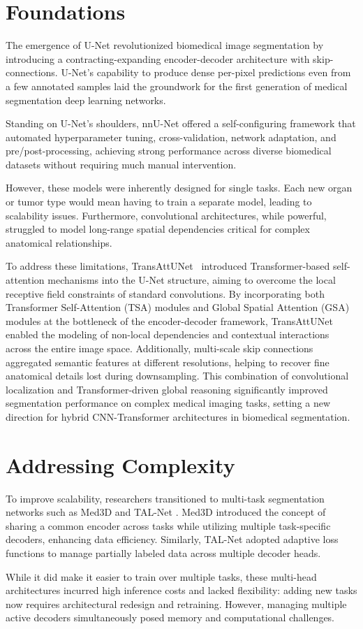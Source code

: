 \documentclass{cls/iutbscthesis}
\begin{document}
\section{Foundations}
The emergence of U-Net \cite{ronneberger2015unet} revolutionized biomedical image segmentation by introducing a contracting-expanding encoder-decoder architecture with skip-connections. U-Net's capability to produce dense per-pixel predictions even from a few annotated samples laid the groundwork for the first generation of medical segmentation deep learning networks.
\par
Standing on U-Net's shoulders, nnU-Net \cite{isensee2021nnunet} offered a self-configuring framework that automated hyperparameter tuning, cross-validation, network adaptation, and pre/post-processing, achieving strong performance across diverse biomedical datasets without requiring much manual intervention.
\par
However, these models were inherently designed for single tasks. Each new organ or tumor type would mean having to train a separate model, leading to scalability issues. Furthermore, convolutional architectures, while powerful, struggled to model long-range spatial dependencies critical for complex anatomical relationships. \cite{chen2024transattunet}
\par
To address these limitations, TransAttUNet~\cite{chen2024transattunet} introduced Transformer-based self-attention mechanisms into the U-Net structure, aiming to overcome the local receptive field constraints of standard convolutions. By incorporating both Transformer Self-Attention (TSA) modules and Global Spatial Attention (GSA) modules at the bottleneck of the encoder-decoder framework, TransAttUNet enabled the modeling of non-local dependencies and contextual interactions across the entire image space. Additionally, multi-scale skip connections aggregated semantic features at different resolutions, helping to recover fine anatomical details lost during downsampling. This combination of convolutional localization and Transformer-driven global reasoning significantly improved segmentation performance on complex medical imaging tasks, setting a new direction for hybrid CNN-Transformer architectures in biomedical segmentation.

\section{Addressing Complexity}
To improve scalability, researchers transitioned to multi-task segmentation networks such as Med3D \cite{chen2019med3d} and TAL-Net \cite{shang2024triaxial}. Med3D introduced the concept of sharing a common encoder across tasks while utilizing multiple task-specific decoders, enhancing data efficiency. Similarly, TAL-Net adopted adaptive loss functions to manage partially labeled data across multiple decoder heads.
\par
While it did make it easier to train over multiple tasks, these multi-head architectures incurred high inference costs and lacked flexibility: adding new tasks now requires architectural redesign and retraining. However, managing multiple active decoders simultaneously posed memory and computational challenges.
\end{document}
